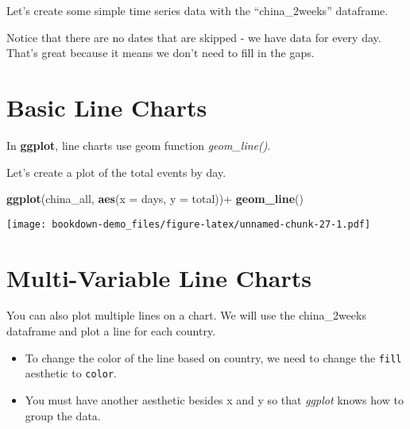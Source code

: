 \documentclass[]{book}
\newenvironment{Shaded}{\begin{snugshade}}{\end{snugshade}}
\newcommand{\KeywordTok}[1]{\textcolor[rgb]{0.13,0.29,0.53}{\textbf{{#1}}}}
\newcommand{\DataTypeTok}[1]{\textcolor[rgb]{0.13,0.29,0.53}{{#1}}}
\newcommand{\StringTok}[1]{\textcolor[rgb]{0.31,0.60,0.02}{{#1}}}
\newcommand{\NormalTok}[1]{{#1}}
\theoremstyle{definition}
\theoremstyle{definition}
\theoremstyle{remark}
\begin{document}
Let's create some simple time series data with the ``china\_2weeks''
dataframe.

\begin{Shaded}
\end{Shaded}

Notice that there are no dates that are skipped - we have data for every
day. That's great because it means we don't need to fill in the gaps.

\section{Basic Line Charts}\label{basic-line-charts}

In \textbf{ggplot}, line charts use geom function \emph{geom\_line()}.

Let's create a plot of the total events by day.

\begin{Shaded}
\begin{Highlighting}[]
\KeywordTok{ggplot}\NormalTok{(china_all, }\KeywordTok{aes}\NormalTok{(}\DataTypeTok{x =} \NormalTok{days, }\DataTypeTok{y =} \NormalTok{total))+}
\StringTok{  }\KeywordTok{geom_line}\NormalTok{()}
\end{Highlighting}
\end{Shaded}

\texttt{[image: bookdown-demo\_files/figure-latex/unnamed-chunk-27-1.pdf]}

\section{Multi-Variable Line Charts}\label{multi-variable-line-charts}

You can also plot multiple lines on a chart. We will use the
china\_2weeks dataframe and plot a line for each country.

\begin{itemize}
\item
  To change the color of the line based on country, we need to change
  the \texttt{fill} aesthetic to \texttt{color}.
\item
  You must have another aesthetic besides x and y so that \emph{ggplot}
  knows how to group the data.
\end{itemize}
\end{document}
